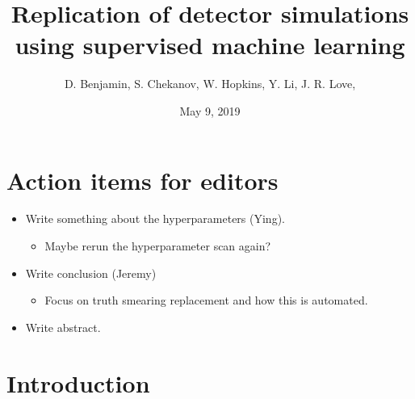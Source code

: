 \documentclass[showpacs,showkeys,preprint,prd,nofootinbib,linenumbers,12pt]{revtex4-1}
\begin{document}


\date{May 9, 2019}

\vspace{2.5cm}

\title{
  Replication of detector simulations using supervised machine learning 
}


\author{D. Benjamin, S. Chekanov, W. Hopkins, Y. Li, J. R. Love,}
% 



\begin{abstract}

\end{abstract}


\maketitle

\section{Action items for editors}
\begin{itemize}
\item Write something about the hyperparameters (Ying).
  \begin{itemize}
  \item Maybe rerun the hyperparameter scan again?
  \end{itemize}
\item Write conclusion (Jeremy)
  \begin{itemize}
  \item Focus on truth smearing replacement and how this is automated.
  \end{itemize}
\item Write abstract.

\end{itemize}

\section{Introduction}
\end{document}
